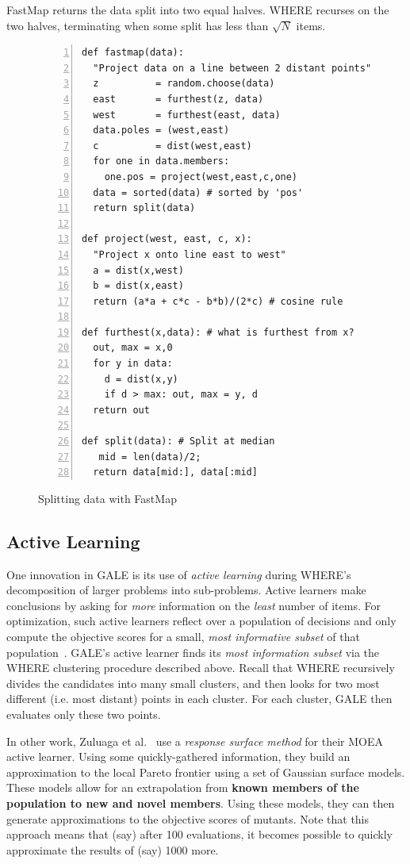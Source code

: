\documentclass[10pt,journal,compsoc]{IEEEtran}
\newcommand{\ADD}[1]{\textcolor{MyDarkBlue}{{\bf #1}}}
\begin{document}
FastMap returns the data split into two
equal halves.
WHERE recurses on the two halves,
terminating when some split
has less than $\sqrt{N}$ items.


\begin{figure}[!b]
\begin{lstlisting}[mathescape,frame=l,numbers=left]
def fastmap(data): 
  "Project data on a line between 2 distant points"
  z          = random.choose(data)
  east       = furthest(z, data)
  west       = furthest(east, data)
  data.poles = (west,east)
  c          = dist(west,east)     
  for one in data.members: 
    one.pos = project(west,east,c,one)
  data = sorted(data) # sorted by 'pos'
  return split(data)

def project(west, east, c, x): 
  "Project x onto line east to west"
  a = dist(x,west)
  b = dist(x,east)
  return (a*a + c*c - b*b)/(2*c) # cosine rule

def furthest(x,data): # what is furthest from x?
  out, max = x,0
  for y in data:
    d = dist(x,y)
    if d > max: out, max = y, d
  return out

def split(data): # Split at median
   mid = len(data)/2; 
  return data[mid:], data[:mid]
\end{lstlisting}
\caption{Splitting data with FastMap}
\label{fig:fastmapCode}   
\end{figure}

\subsection{Active Learning}

One innovation in GALE is its use of  {\em active learning} during
WHERE's decomposition of larger problems into sub-problems.
Active learners make conclusions by asking for {\em
more} information on the {\em least} number of
items.  For optimization,  such active learners
reflect over a population of decisions and only
compute the objective scores for a small, {\em most
informative subset} of that
population~\cite{Zuluaga:13}. 
GALE's active learner finds its {\em most information subset} via the WHERE
clustering procedure described above.
Recall that
WHERE recursively divides the candidates into many small clusters,
and then looks for two most different (i.e. most distant) points
in each cluster. For each cluster, GALE then evaluates only these
two points. 

In other work, Zuluaga et
al.~\cite{Zuluaga:13} use a {\em response surface
  method} for their MOEA active learner.  Using some
quickly-gathered information, they build an
approximation to the local Pareto frontier using a
set of Gaussian surface models. These models allow
for an extrapolation from \ADD{known members of the
population to new and novel members}.  Using these models, they can then
generate approximations to the objective scores of
mutants. Note that this approach means that (say)
after 100 evaluations, it becomes possible to
quickly approximate the results of (say) 1000 more.
\end{document}
